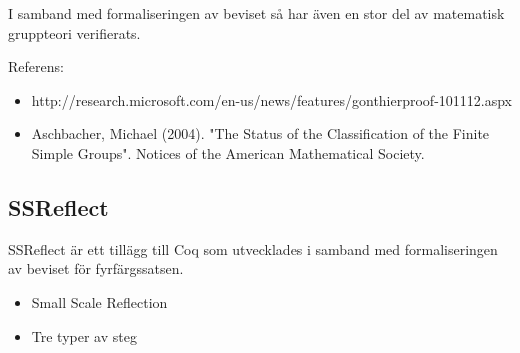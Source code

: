 I samband med formaliseringen av beviset så har även en stor del av matematisk
gruppteori verifierats.

Referens:
\begin{itemize}
  \item http://research.microsoft.com/en-us/news/features/gonthierproof-101112.aspx
  \item Aschbacher, Michael (2004). "The Status of the Classification of the
    Finite Simple Groups". Notices of the American Mathematical Society.
\end{itemize}

\subsection{SSReflect}
SSReflect är ett tillägg till Coq som utvecklades i samband med formaliseringen
av beviset för fyrfärgssatsen.

\begin{itemize}
  \item Small Scale Reflection
  \item Tre typer av steg
\end{itemize}
